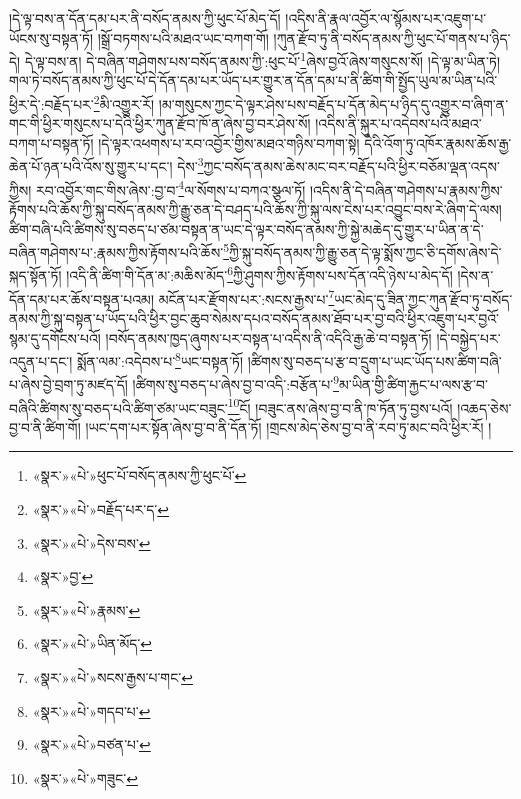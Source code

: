 །དེ་ལྟ་བས་ན་དོན་དམ་པར་ནི་བསོད་ནམས་ཀྱི་ཕུང་པོ་མེད་དོ། །འདིས་ནི་རྣལ་འབྱོར་ལ་སྙོམས་པར་འཇུག་པ་ཡོངས་སུ་བསྟན་ཏོ། །སྒྲོ་བཏགས་པའི་མཐའ་ཡང་བཀག་གོ། །ཀུན་རྫོབ་ཏུ་ནི་བསོད་ནམས་ཀྱི་ཕུང་པོ་གནས་པ་ཉིད་དེ། དེ་ལྟ་བས་ན། དེ་བཞིན་གཤེགས་པས་བསོད་ནམས་ཀྱི་:ཕུང་པོ་\footnote{«སྣར་»«པེ་»ཕུང་པོ་བསོད་ནམས་ཀྱི་ཕུང་པོ་}ཞེས་བྱའོ་ཞེས་གསུངས་སོ། །དེ་ལྟ་མ་ཡིན་ཏེ། གལ་ཏེ་བསོད་ནམས་ཀྱི་ཕུང་པོ་དེ་དོན་དམ་པར་ཡོད་པར་གྱུར་ན་དོན་དམ་པ་ནི་ཚིག་གི་སྤྱོད་ཡུལ་མ་ཡིན་པའི་ཕྱིར་དེ་:བརྗོད་པར་\footnote{«སྣར་»«པེ་»བརྗོད་པར་ད་}མི་འགྱུར་རོ། །མ་གསུངས་ཀྱང་དེ་ལྟར་ཤེས་པས་བརྗོད་པ་དོན་མེད་པ་ཉིད་དུ་འགྱུར་བ་ཞིག་ན་གང་གི་ཕྱིར་གསུངས་པ་དེའི་ཕྱིར་ཀུན་རྫོབ་ཁོ་ན་ཞེས་བྱ་བར་ཤེས་སོ། །འདིས་ནི་སྐུར་པ་འདེབས་པའི་མཐའ་བཀག་པ་བསྟན་ཏོ། །དེ་ལྟར་འཕགས་པ་རབ་འབྱོར་གྱིས་མཐའ་གཉིས་བཀག་སྟེ། དེའི་འོག་ཏུ་འཁོར་རྣམས་ཆོས་རྒྱ་ཆེན་པོ་ཉན་པའི་འོས་སུ་གྱུར་པ་དང་། དེས་\footnote{«སྣར་»«པེ་»དེས་བས་}ཀྱང་བསོད་ནམས་ཆེས་མང་བར་བརྗོད་པའི་ཕྱིར་བཅོམ་ལྡན་འདས་ཀྱིས། རབ་འབྱོར་གང་གིས་ཞེས་:བྱ་བ་\footnote{«སྣར་»བྱ་}ལ་སོགས་པ་བཀའ་སྩལ་ཏོ། །འདིས་ནི་དེ་བཞིན་གཤེགས་པ་རྣམས་ཀྱིས་རྟོགས་པའི་ཆོས་ཀྱི་སྐུ་བསོད་ནམས་ཀྱི་རྒྱུ་ཅན་དེ་བཤད་པའི་ཆོས་ཀྱི་སྐུ་ལས་ངེས་པར་འབྱུང་བས་རེ་ཞིག་དེ་ལས། ཚིག་བཞི་པའི་ཚིགས་སུ་བཅད་པ་ཙམ་བསྟན་ན་ཡང་དེ་ལྟར་བསོད་ནམས་ཀྱི་སྐྱེ་མཆེད་དུ་གྱུར་པ་ཡིན་ན་དེ་བཞིན་གཤེགས་པ་:རྣམས་ཀྱིས་རྟོགས་པའི་ཆོས་\footnote{«སྣར་»«པེ་»རྣམས་}ཀྱི་སྐུ་བསོད་ནམས་ཀྱི་རྒྱུ་ཅན་དེ་ལྟ་སྨོས་ཀྱང་ཅི་དགོས་ཞེས་དེ་སྐད་སྟོན་ཏོ། །འདི་ནི་ཚིག་གི་དོན་མ་:མཆིས་མོད་\footnote{«སྣར་»«པེ་»ཡིན་མོད་}ཀྱི་ཤུགས་ཀྱིས་རྟོགས་པས་དོན་འདི་ཉེས་པ་མེད་དོ། །དེས་ན་དོན་དམ་པར་ཆོས་བསྟན་པའམ། མངོན་པར་རྫོགས་པར་:སངས་རྒྱས་པ་\footnote{«སྣར་»«པེ་»སངས་རྒྱས་པ་གང་}ཡང་མེད་དུ་ཟིན་ཀྱང་ཀུན་རྫོབ་ཏུ་བསོད་ནམས་ཀྱི་སྐུ་བསྟན་པ་ཡོད་པའི་ཕྱིར་བྱང་ཆུབ་སེམས་དཔའ་བསོད་ནམས་ཐོབ་པར་བྱ་བའི་ཕྱིར་འཇུག་པར་བྱའོ་སྙམ་དུ་དགོངས་པའོ། །བསོད་ནམས་ཁྱད་ཞུགས་པར་བསྟན་པ་འདིས་ནི་འདིའི་རྒྱ་ཆེ་བ་བསྟན་ཏོ། །དེ་བསྐྱེད་པར་འདུན་པ་དང་། སྨོན་ལམ་:འདེབས་པ་\footnote{«སྣར་»«པེ་»གདབ་པ་}ཡང་བསྟན་ཏོ། །ཚིགས་སུ་བཅད་པ་རྩ་བ་དྲུག་པ་ཡང་ཡོད་པས་ཚིག་བཞི་པ་ཞེས་བྱེ་བྲག་ཏུ་མཛད་དོ། །ཚིགས་སུ་བཅད་པ་ཞེས་བྱ་བ་འདི་:བརྩོན་པ་\footnote{«སྣར་»«པེ་»བཙན་པ་}མ་ཡིན་གྱི་ཚིག་རྐྱང་པ་ལས་རྩ་བ་བཞིའི་ཚིགས་སུ་བཅད་པའི་ཚིག་ཙམ་ཡང་བཟུང་\footnote{«སྣར་»«པེ་»གཟུང་}ངོ། །བཟུང་ནས་ཞེས་བྱ་བ་ནི་ཁ་ཏོན་ཏུ་བྱས་པའོ། །འཆད་ཅེས་བྱ་བ་ནི་ཚིག་གོ། །ཡང་དག་པར་སྟོན་ཞེས་བྱ་བ་ནི་དོན་ཏོ། །གྲངས་མེད་ཅེས་བྱ་བ་ནི་རབ་ཏུ་མང་བའི་ཕྱིར་རོ། །
